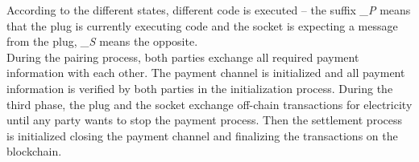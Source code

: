 According to the different states, different code is executed  – the suffix \textit{\_P} means that the plug is currently executing code and the socket is expecting a message from the plug, \textit{\_S} means the opposite.
\\
During the pairing process, both parties exchange all required payment information with each other.
The payment channel is initialized and all payment information is verified by both parties in the initialization process.
During the third phase, the plug and the socket exchange off-chain transactions for electricity until any party wants to stop the payment process.
Then the settlement process is initialized closing the payment channel and finalizing the transactions on the blockchain.
\\\\\\

